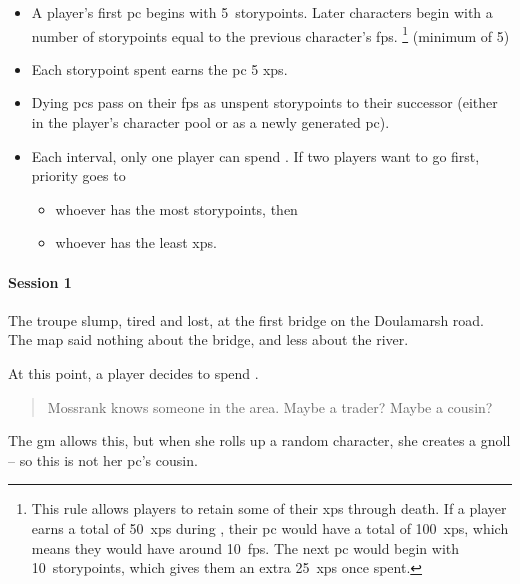 \begin{multicols}{2}

\begin{itemize}
  \item
  A player's first \gls{pc} begins with 5~\glspl{storypoint}.
  \label{storyPointInheritance}
  Later characters begin with a number of \glspl{storypoint} equal to the previous character's \glspl{fp}.%
  \footnote{This rule allows players to retain some of their \glspl{xp} through death.
  If a player earns a total of 50~\glspl{xp} during , their \gls{pc} would have a total of 100~\glspl{xp}, which means they would have around 10~\glspl{fp}.
  The next \gls{pc} would begin with 10~\glspl{storypoint}, which gives them an extra 25~\glspl{xp} once spent.} (minimum of 5)
  \item
  Each \gls{storypoint} spent earns the \gls{pc} 5 \glspl{xp}.
  \item
  Dying \glspl{pc} pass on their \glspl{fp} as unspent \glspl{storypoint} to their successor (either in the player's character pool or as a newly generated \gls{pc}).
  \item
  Each \gls{interval}, only one player can spend .
  If two players want to go first, priority goes to
  \begin{itemize}
    \item
    whoever has the most \glspl{storypoint}, then
    \item
    whoever has the least \glspl{xp}.
  \end{itemize}
\end{itemize}

\begin{exampletext}
  \paragraph{Session 1}
  The troupe slump, tired and lost, at the first bridge on the Doulamarsh road.
  The map said nothing about the bridge, and less about the river.

  At this point, a player decides to spend .

  \begin{quotation}
    Mossrank knows someone in the area.
    Maybe a trader?
    Maybe a cousin?
  \end{quotation}

  The \gls{gm} allows this, but when she rolls up a random character, she creates a gnoll -- so this is not her \gls{pc}'s cousin.


\end{exampletext}
\end{multicols}
